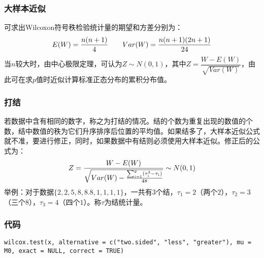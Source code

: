 \subsubsection{大样本近似}
可求出Wilcoxon符号秩检验统计量的期望和方差分别为：
\begin{equation}
	E(W)=\frac{n(n+1)}{4}\qquad Var(W)=\frac{n(n+1)(2n+1)}{24}\notag
\end{equation}
\hspace{2em}当$n$较大时，由中心极限定理，可认为$Z\sim N(0,1)$，其中$Z=\dfrac{W-E(W)}{\sqrt{Var(W)}}$，由此可在求$p$值时近似计算标准正态分布的累积分布值。
\subsubsection{打结}
若数据中含有相同的数字，称之为打结的情况。结的个数为重复出现的数值的个数，结中数值的秩为它们升序排序后位置的平均值。如果结多了，大样本近似公式就不准，要进行修正，同时，如果数据中有结则必须使用大样本近似。修正后的公式为：
\begin{equation}
	Z=\frac{W-E(W)}{\sqrt{Var(W)-\frac{\sum_{i=1}^{g}(\tau_i^3-\tau_i)}{48}}}\sim N(0,1)\notag
\end{equation}
\hspace{2em}举例：对于数据$\{2,2,5,8,8.8,1,1,1,1\}$，一共有$3$个结，$\tau_1=2$（两个$2$），$\tau_2=3$（三个$8$），$\tau_3=4$（四个$1$）。称$\tau$为结统计量。
\subsubsection{代码}
\begin{verbatim}
wilcox.test(x, alternative = c("two.sided", "less", "greater"), mu = M0, exact = NULL, correct = TRUE)
\end{verbatim}